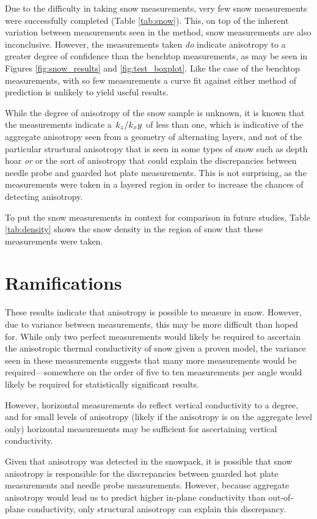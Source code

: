 Due to the difficulty in taking snow measurements, very few snow measurements were
successfully completed (Table \ref{tab:snow}). This, on top of the inherent variation between measurements seen in the method, snow measurements are also inconclusive. However, the
measurements taken \emph{do} indicate anisotropy to a greater degree of confidence
than the benchtop measurements, as may be seen in Figures \ref{fig:snow_results}
 and \ref{fig:test_boxplot}. Like the case of the benchtop measurements, with so few
measurements a curve fit against either method of prediction is unlikely to
yield useful results.

While the degree of anisotropy of the snow sample is unknown, it is known that
the measurements indicate a \(\left.{k_z}\middle/{k_xy}\right.\) of less than one, which is
indicative of the aggregate anisotropy seen from a geometry of alternating
layers, and not of the particular structural anisotropy that is seen in some
types of snow such as depth hoar \emph{or} or the sort of anisotropy that could
explain the discrepancies between needle probe and guarded hot plate measurements.
This is not surprising, as the measurements were taken in a layered region in
order to increase the chances of detecting anisotropy.

To put the snow measurements in context for comparison in future studies, Table
\ref{tab:density} shows the snow density in the region of snow
that these measurements were taken.

\section{Ramifications}

These results indicate that anisotropy is possible to measure in snow. However,
due to variance between measurements, this may be more difficult than hoped for.
While only two perfect measurements would likely be required to ascertain the
anisotropic thermal conductivity of snow given a proven model, the variance seen
in these measurements suggests that many more measurements would be
required---somewhere on the order of five to ten measurements per angle would
likely be required for statistically significant results.

However, horizontal measurements do reflect vertical conductivity to a degree,
and for small levels of anisotropy (likely if the anisotropy is on the aggregate
level only) horizontal measurements may be sufficient for ascertaining vertical
conductivity.

Given that anisotropy was detected in the snowpack, it is possible that snow
anisotropy is responsible for the discrepancies between guarded hot plate
measurements and needle probe measurements. However, because aggregate anisotropy
would lead us to predict higher in-plane conductivity than out-of-plane conductivity,
only structural anisotropy can explain this discrepancy.
